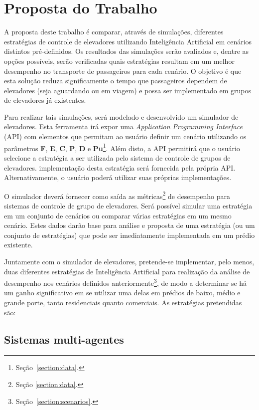 \chapter{\label{chap:proposal}Proposta do Trabalho}

A proposta deste trabalho é comparar, através de simulações, diferentes
estratégias de controle de elevadores utilizando Inteligência Artificial em
cenários distintos pré-definidos. Os resultados das simulações serão avaliados
e, dentre as opções possíveis, serão verificadas quais estratégias resultam em
um melhor desempenho no transporte de passageiros para cada cenário. O objetivo
é que esta solução reduza significamente o tempo que passageiros dependem de
elevadores (seja aguardando ou em viagem) e possa ser implementado em grupos de
elevadores já existentes.

Para realizar tais simulações, será modelado e desenvolvido um simulador de
elevadores. Esta ferramenta irá expor uma \textit{Application Programming
Interface} (API) com elementos que permitam ao usuário definir um cenário
utilizando os parâmetros \textbf{F}, \textbf{E}, \textbf{C}, \textbf{P},
\textbf{D} e \textbf{Pu}\footnote{Seção~\ref{section:data}.}. Além disto, a API
permitirá que o usuário selecione a estratégia a ser utilizada pelo sistema de
controle de grupos de elevadores. implementação desta estratégia será fornecida
pela própria API. Alternativamente, o usuário poderá utilizar suas próprias
implementações.

O simulador deverá fornecer como saída as métricas\footnote{Seção
\ref{section:data}.} de desempenho para sistemas de controle de grupo de
elevadores. Será possível simular uma estratégia em um conjunto de cenários ou
comparar várias estratégias em um mesmo cenário. Estes dados darão base para
análise e proposta de uma estratégia (ou um conjunto de estratégias) que pode
ser imediatamente implementada em um prédio existente.

Juntamente com o simulador de elevadores, pretende-se implementar, pelo menos,
duas diferentes estratégias de Inteligência Artificial para realização da
análise de desempenho nos cenários definidos
anteriormente\footnote{Seção~\ref{section:scenarios}.}, de modo a determinar se
há um ganho significativo em se utilizar uma delas em prédios de baixo, médio e
grande porte, tanto residenciais quanto comerciais. As estratégias pretendidas
são:

\section{\label{section:multiagentes}Sistemas multi-agentes}
